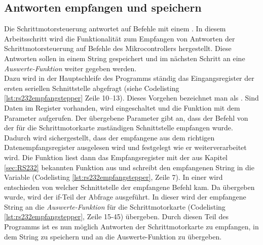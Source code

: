 \subsection{Antworten empfangen und speichern}
\label{sec:Empfangen_Schrittmotor}
Die Schrittmotorsteuerung antwortet auf Befehle mit einem . In diesem Arbeitsschritt wird die Funktionalität zum Empfangen von Antworten der Schrittmotorsteuerung auf Befehle des Mikrocontrollers hergestellt. Diese Antworten sollen in einem String gespeichert und im nächsten Schritt an eine \emph{Auswerte-Funktion} weiter gegeben werden.\\
Dazu wird in der Hauptschleife des Programms ständig das Eingangsregister der ersten seriellen Schnittstelle abgefragt (siehe Codelisting \ref{lst:rs232empfangstepper} Zeile 10--13). Dieses Vorgehen bezeichnet man als .
Sind Daten im Register vorhanden, wird  eingeschaltet und die Funktion  mit dem Parameter  aufgerufen. Der übergebene Parameter gibt an, dass der Befehl von der für die Schrittmotorkarte zuständigen Schnittstelle empfangen wurde. Dadurch wird sichergestellt, dass der empfangene  aus dem richtigen Datenempfangsregister ausgelesen wird und festgelegt wie er weiterverarbeitet wird. Die Funktion  liest dann das Empfangsregister mit der aus Kapitel \ref{sec:RS232} bekannten Funktion \linebreak{} aus und schreibt den empfangenen String in die Variable (Codelisting \ref{lst:rs232empfangstepper}, Zeile 7). In einer  wird entschieden von welcher Schnittstelle der empfangene Befehl kam. Da  übergeben wurde, wird der if-Teil der Abfrage ausgeführt. In dieser wird der empfangene String an die \emph{Auswerte-Funktion} für die Schrittmotorkarte (Codelisting \ref{lst:rs232empfangstepper}, Zeile 15-45) übergeben.
Durch diesen Teil des Programms ist es nun möglich Antworten der Schrittmotorkarte zu empfangen, in dem String  zu speichern und an die Auswerte-Funktion  zu übergeben.
\lstset{language=C, basicstyle=\footnotesize, showstringspaces=false, tabsize=8}



